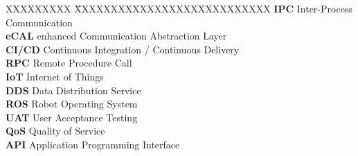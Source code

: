 \documentclass[a4paper,12pt,singlespacing]{article}
\begin{document}
\begin{tabbing}
	XXXXXXXXX \= XXXXXXXXXXXXXXXXXXXXXXXXXXX \kill %
	\textbf{IPC} \> Inter-Process Communication\\[0.5cm]
	\textbf{eCAL} \> enhanced Communication Abstraction Layer\\[0.5cm]
	\textbf{CI/CD} \> Continuous Integration / Continuous Delivery\\[0.5cm]
	\textbf{RPC} \> Remote Procedure Call\\[0.5cm]
	\textbf{IoT} \> Internet of Things\\[0.5cm]
	\textbf{DDS} \> Data Distribution Service\\[0.5cm]
	\textbf{ROS} \> Robot Operating System\\[0.5cm]
	\textbf{UAT} \> User Acceptance Testing\\[0.5cm]
	\textbf{QoS} \> Quality of Service\\[0.5cm]
	\textbf{API} \> Application Programming Interface\\[0.5cm]
\end{tabbing}

\pagebreak
{}
\pagestyle{scrheadings}







\printbibliography[heading=bibintoc]
\end{document}
